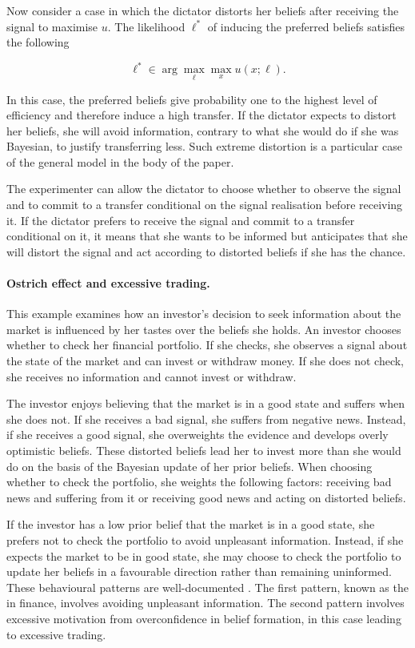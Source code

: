 Now consider a case in which the dictator distorts her beliefs after receiving the signal to maximise \( u \). The likelihood \( \ell^{*} \) of inducing the preferred beliefs satisfies the following

\[
	\ell^{*} \in \arg \max_{\ell} \max_{x} u \left( x ; \ell \right) .
\]

In this case, the preferred beliefs give probability one to the highest level of efficiency and therefore induce a high transfer. If the dictator expects to distort her beliefs, she will avoid information, contrary to what she would do if she was Bayesian, to justify transferring less. Such extreme distortion is a particular case of the general model in the body of the paper.

The experimenter can allow the dictator to choose whether to observe the signal and to commit to a transfer conditional on the signal realisation before receiving it. If the dictator prefers to receive the signal and commit to a transfer conditional on it, it means that she wants to be informed but anticipates that she will distort the signal and act according to distorted beliefs if she has the chance.

\paragraph{Ostrich effect and excessive trading.} This example examines how an investor’s decision to seek information about the market is influenced by her tastes over the beliefs she holds. An investor chooses whether to check her financial portfolio. If she checks, she observes a signal about the state of the market and can invest or withdraw money. If she does not check, she receives no information and cannot invest or withdraw.

The investor enjoys believing that the market is in a good state and suffers when she does not. If she receives a bad signal, she suffers from negative news. Instead, if she receives a good signal, she overweights the evidence and develops overly optimistic beliefs. These distorted beliefs lead her to invest more than she would do on the basis of the Bayesian update of her prior beliefs. When choosing whether to check the portfolio, she weights the following factors: receiving bad news and suffering from it or receiving good news and acting on distorted beliefs.

If the investor has a low prior belief that the market is in a good state, she prefers not to check the portfolio to avoid unpleasant information. Instead, if she expects the market to be in good state, she may choose to check the portfolio to update her beliefs in a favourable direction rather than remaining uninformed. These behavioural patterns are well-documented \citep{danielOverconfidentInvestorsPredictable2015,golmanInformationAvoidance2017}. The first pattern, known as the  in finance, involves avoiding unpleasant information. The second pattern involves excessive motivation from overconfidence in belief formation, in this case leading to excessive trading.

